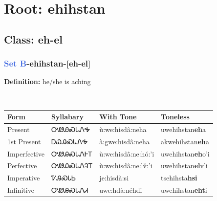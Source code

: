 \needspace{4in}
\section*{Root: ehihstan}
\nopagebreak
{}
\needspace{3in}
\subsection*{Class: eh-el}
\nopagebreak
\needspace{2in}
\subsubsection*{\textcolor{RoyalBlue}{Set B}{-}\textbf{ehihstan}{-}[eh-el]}
\nopagebreak
\textbf{Definition: } he/she is aching
\\[0.5em]
\begin{tabularx}{\textwidth}{l X X X}%
\toprule%
\textbf{Form}&\textbf{Syllabary}&\textbf{With Tone}&\textbf{Toneless}\\%
\midrule%
Present&ᎤᏪᎯᏍᏓᏁᎭ&ù:we:hisdâ:neha&uwehihstan\textbf{eh}a\\%
1st Present&ᎠᏇᎯᏍᏓᏁᎭ&à:gwe:hisdâ:neha&akwehihstan\textbf{eh}a\\%
Imperfective&ᎤᏪᎯᏍᏓᏁᎰᎢ&ù:we:hisdâ:ne:hó:’i&uwehihstan\textbf{eh}o'i\\%
Perfective&ᎤᏪᎯᏍᏓᏁᎸᎢ&ù:we:hisdâ:ne:lv̌:’i&uwehihstan\textbf{el}v'i\\%
Imperative&ᏤᎯᏍᏓᏏ&je:hisdà:si&tsehihsta\textbf{hsi}\\%
Infinitive&ᎤᏪᎯᏍᏓᏁᏗ&uwe:hdà:néhdi&uwehihstan\textbf{eht}i\\%
\bottomrule%
\end{tabularx}
\\[1em]